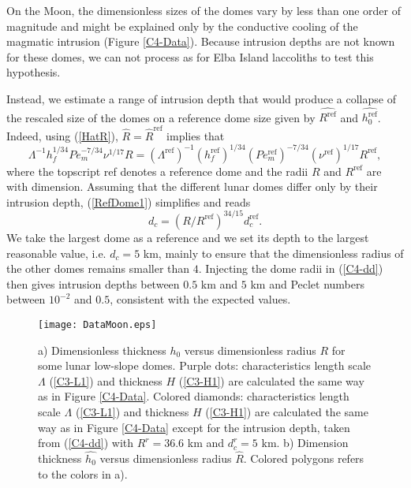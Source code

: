 On the  Moon, the dimensionless sizes  of the domes vary  by less than
one order of  magnitude and might be explained only  by the conductive
cooling  of the  magmatic intrusion  (Figure \ref{C4-Data}).   Because
intrusion depths are not known for  these domes, we can not process as
for Elba Island laccoliths to test this hypothesis.

Instead, we estimate  a range of intrusion depth that  would produce a
collapse of  the rescaled size of  the domes on a  reference dome size
given by $\hat{R^{\text{ref}}}$ and $\hat{h_0^{\text{ref}}}$.  Indeed,
using (\ref{HatR}), $\hat{R}=\hat{R}^{\text{ref}}$ implies that
\begin{equation}
  \Lambda^{-1}h_f^{1/34}Pe_m^{-7/34}\nu^{1/17}R =   \left(\Lambda^{\text{ref}}\right)^{-1}\left(h_f^{\text{ref}}\right)^{1/34}\left(Pe_m^{\text{ref}}\right)^{-7/34}\left(\nu^{\text{ref}}\right)^{1/17}R^{\text{ref}},\label{RefDome1}
\end{equation}
where the topscript ref denotes a reference dome and the radii $R$ and
$R^{\text{ref}}$ are with dimension. Assuming that the different lunar
domes  differ   only  by   their  intrusion   depth,  (\ref{RefDome1})
simplifies and reads
\begin{equation}
  d_c = \left(R/R^{\text{ref}}\right)^{34/15}d_c^{\text{ref}}.
  \label{C4-dd}
\end{equation}
We take the  largest dome as a  reference and we set its  depth to the
largest reasonable value, i.e.  $d_c=5$  km, mainly to ensure that the
dimensionless  radius of  the other  domes remains  smaller than  $4$.
Injecting the dome radii in  (\ref{C4-dd}) then gives intrusion depths
between $0.5$ km  and $5$ km and Peclet numbers  between $10^{-2}$ and
$0.5$, consistent with the expected values.
\begin{figure}[h!]
  \begin{center}
    \graphicspath{ {/Users/thorey/Documents/These/Projet/Refroidissement/Skin_Model/Figure/Figure_Heating/} }
    \texttt{[image: DataMoon.eps]}
    \caption{  a) Dimensionless  thickness $h_0$  versus dimensionless
      radius  $R$  for  some  lunar  low-slope  domes.   Purple  dots:
      characteristics   length  scale   $\Lambda$  (\ref{C3-L1})   and
      thickness $H$  (\ref{C3-H1}) are calculated  the same way  as in
      Figure \ref{C4-Data}.  Colored  diamonds: characteristics length
      scale  $\Lambda$ (\ref{C3-L1})  and thickness  $H$ (\ref{C3-H1})
      are calculated  the same way  as in Figure  \ref{C4-Data} except
      for  the   intrusion  depth,   taken  from   (\ref{C4-dd})  with
      $R^r  =  36.6$ km  and  $d_c^r=5$  km.  b)  Dimension  thickness
      $\hat{h_0}$  versus  dimensionless  radius  $\hat{R}$.   Colored
      polygons refers to the colors in a).}
    \label{C4-ArrestMoon}
  \end{center}
\end{figure}
